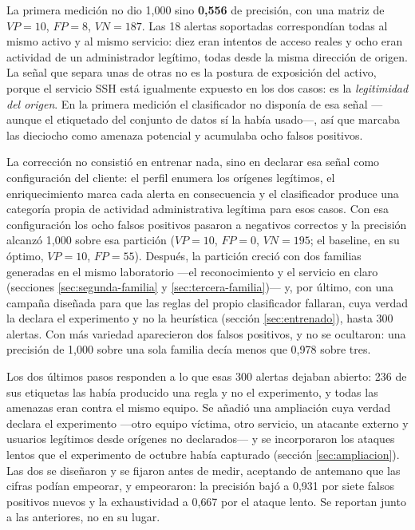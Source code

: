 La primera medición no dio 1,000 sino \textbf{0,556} de precisión, con una matriz de $VP=10$,
$FP=8$, $VN=187$. Las 18 alertas soportadas correspondían todas al mismo activo y al mismo servicio:
diez eran intentos de acceso reales y ocho eran actividad de un administrador legítimo, todas desde
la misma dirección de origen. La señal que separa unas de otras no es la postura de exposición del
activo, porque el servicio SSH está igualmente expuesto en los dos casos: es la \emph{legitimidad
del origen}. En la primera medición el clasificador no disponía de esa señal ---aunque el etiquetado
del conjunto de datos sí la había usado---, así que marcaba las dieciocho como amenaza potencial y
acumulaba ocho falsos positivos.

La corrección no consistió en entrenar nada, sino en declarar esa señal como configuración del
cliente: el perfil enumera los orígenes legítimos, el enriquecimiento marca cada alerta en
consecuencia y el clasificador produce una categoría propia de actividad administrativa legítima
para esos casos. Con esa configuración los ocho falsos positivos pasaron a negativos correctos y la
precisión alcanzó 1,000 sobre esa partición ($VP=10$, $FP=0$, $VN=195$; el baseline, en su óptimo,
$VP=10$, $FP=55$). Después, la partición creció con dos familias generadas en el mismo laboratorio
---el reconocimiento y el servicio en claro (secciones \ref{sec:segunda-familia} y
\ref{sec:tercera-familia})--- y, por último, con una campaña diseñada para que las reglas del
propio clasificador fallaran, cuya verdad la declara el experimento y no la heurística (sección
\ref{sec:entrenado}), hasta 300 alertas. Con más variedad aparecieron dos falsos positivos, y no se
ocultaron: una precisión de 1,000 sobre una sola familia decía menos que 0,978 sobre tres.

Los dos últimos pasos responden a lo que esas 300 alertas dejaban abierto: 236 de sus etiquetas las
había producido una regla y no el experimento, y todas las amenazas eran contra el mismo equipo. Se
añadió una ampliación cuya verdad declara el experimento ---otro equipo víctima, otro servicio, un
atacante externo y usuarios legítimos desde orígenes no declarados--- y se incorporaron los ataques
lentos que el experimento de octubre había capturado (sección \ref{sec:ampliacion}). Las dos se
diseñaron y se fijaron antes de medir, aceptando de antemano que las cifras podían empeorar, y
empeoraron: la precisión bajó a 0,931 por siete falsos positivos nuevos y la exhaustividad a 0,667
por el ataque lento. Se reportan junto a las anteriores, no en su lugar.

